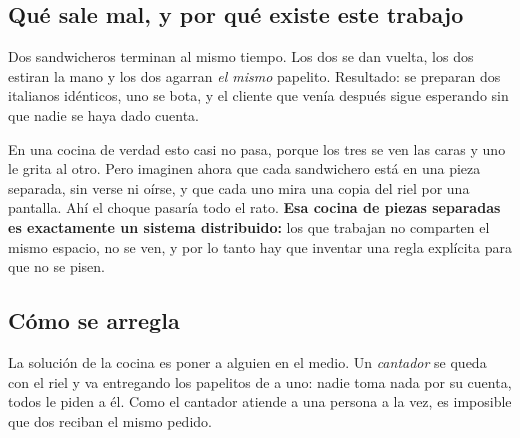 \documentclass[11pt,a4paper]{article}
\begin{document}
\subsection{Qué sale mal, y por qué existe este trabajo}

Dos sandwicheros terminan al mismo tiempo. Los dos se dan vuelta, los dos estiran la mano y los dos agarran \emph{el mismo} papelito. Resultado: se preparan dos italianos idénticos, uno se bota, y el cliente que venía después sigue esperando sin que nadie se haya dado cuenta.

En una cocina de verdad esto casi no pasa, porque los tres se ven las caras y uno le grita al otro. Pero imaginen ahora que cada sandwichero está en una pieza separada, sin verse ni oírse, y que cada uno mira una copia del riel por una pantalla. Ahí el choque pasaría todo el rato. \textbf{Esa cocina de piezas separadas es exactamente un sistema distribuido:} los que trabajan no comparten el mismo espacio, no se ven, y por lo tanto hay que inventar una regla explícita para que no se pisen.

\subsection{Cómo se arregla}

La solución de la cocina es poner a alguien en el medio. Un \emph{cantador} se queda con el riel y va entregando los papelitos de a uno: nadie toma nada por su cuenta, todos le piden a él. Como el cantador atiende a una persona a la vez, es imposible que dos reciban el mismo pedido.
\end{document}
